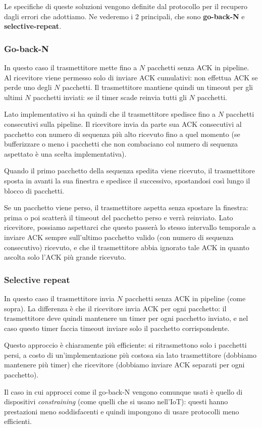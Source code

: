 \documentclass[a4paper,11pt]{article}
\begin{document}
Le specifiche di queste soluzioni vengono definite dal protocollo per il recupero dagli errori che adottiamo. 
Ne vederemo i 2 principali, che sono \textbf{go-back-N} e \textbf{selective-repeat}.

\subsubsection{Go-back-N}
In questo caso il trasmettitore mette fino a $N$ pacchetti senza ACK in pipeline.
Al ricevitore viene permesso solo di inviare ACK cumulativi: non effettua ACK se perde uno degli $N$ pacchetti.
Il trasmettitore mantiene quindi un timeout per gli ultimi $N$ pacchetti inviati: se il timer scade reinvia tutti gli $N$ pacchetti.

\par\smallskip

Lato implementativo si ha quindi che il trasmettitore spedisce fino a $N$ pacchetti consecutivi sulla pipeline.
Il ricevitore invia da parte sua ACK consecutivi al pacchetto con numero di sequenza più alto ricevuto fino a quel momento (se bufferizzare o meno i pacchetti che non combaciano col numero di sequenza aspettato è una scelta implementativa).

Quando il primo pacchetto della sequenza spedita viene ricevuto, il trasmettitore sposta in avanti la sua finestra e spedisce il successivo, spostandosi così lungo il blocco di pacchetti.

Se un pacchetto viene perso, il trasmettitore aspetta senza spostare la finestra: prima o poi scatterà il timeout del pacchetto perso e verrà reinviato.
Lato ricevitore, possiamo aspettarci che questo passerà lo stesso intervallo temporale a inviare ACK sempre sull'ultimo pacchetto valido (con numero di sequenza consecutivo) ricevuto, e che il trasmettitore abbia ignorato tale ACK in quanto ascolta solo l'ACK più grande ricevuto.

\subsubsection{Selective repeat}
In questo caso il trasmettitore invia $N$ pacchetti senza ACK in pipeline (come sopra).
La differenza è che il ricevitore invia ACK per ogni pacchetto: il trasmettitore deve quindi mantenere un timer per ogni pacchetto inviato, e nel caso questo timer faccia timeout inviare solo il pacchetto corrispondente.

Questo approccio è chiaramente più efficiente: si ritrasmettono solo i pacchetti persi, a costo di un'implementazione più costosa sia lato trasmettitore (dobbiamo mantenere più timer) che ricevitore (dobbiamo inviare ACK separati per ogni pacchetto).

Il caso in cui approcci come il go-back-N vengono comunque usati è quello di dispositivi \textit{constraining} (come quelli che si usano nell'IoT): questi hanno prestazioni meno soddisfacenti e quindi impongono di usare protocolli meno efficienti.
\end{document}
